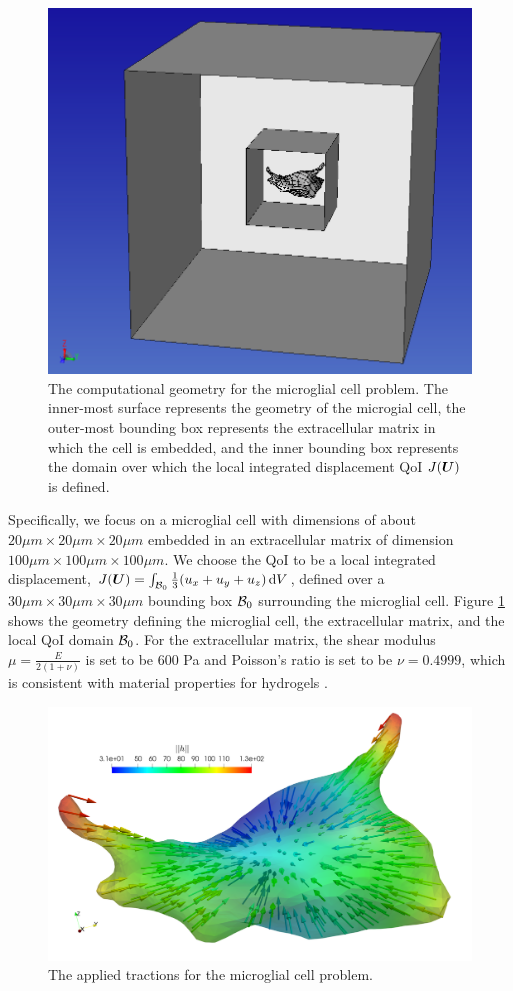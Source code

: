 \begin{figure}[ht!]
\centering
\includegraphics[width=.6\linewidth]{img/mech_glial_geom.png}
\centering
\caption{The computational geometry for the microglial cell problem. The
inner-most surface represents the geometry of the microgial cell, the
outer-most bounding box represents the extracellular matrix in which the
cell is embedded, and the inner bounding box represents the domain over
which the local integrated displacement QoI $J(\boldsymbol{U})$ is defined.}
\label{fig:mech_glial_geom}
\end{figure}

Specifically, we focus on a microglial cell with dimensions of about
$20 \mu m \times 20 \mu m \times 20 \mu m$ embedded in an extracellular matrix
of dimension $100 \mu m \times 100 \mu m \times 100 \mu m$. We choose the
QoI to be a local integrated displacement,
$J(\boldsymbol{U}) = \int_{\mathcal{B}_0} \frac13 (u_x + u_y + u_z) \, \text{d} V$, defined
over a $30 \mu m \times 30 \mu m \times 30 \mu m$ bounding box $\mathcal{B}_0$
surrounding the microglial cell. Figure \ref{fig:mech_glial_geom} shows the
geometry defining the microglial cell, the extracellular matrix, and the
local QoI domain $\mathcal{B}_0$. For the extracellular matrix,
the shear modulus $\mu = \frac{E}{2(1 + \nu)}$ is set to be 600 Pa and
Poisson's ratio is set to be $\nu = 0.4999$, which is consistent with
material properties for hydrogels
\cite{legant2010measurement, paszek2005tensional, discher2005tissue}.

\begin{figure}[ht!]
\centering
\includegraphics[width=.6\linewidth]{img/mech_glial_applied_traction.png}
\centering
\caption{The applied tractions for the microglial cell problem.}
\label{fig:mech_glial_traction}
\end{figure}

